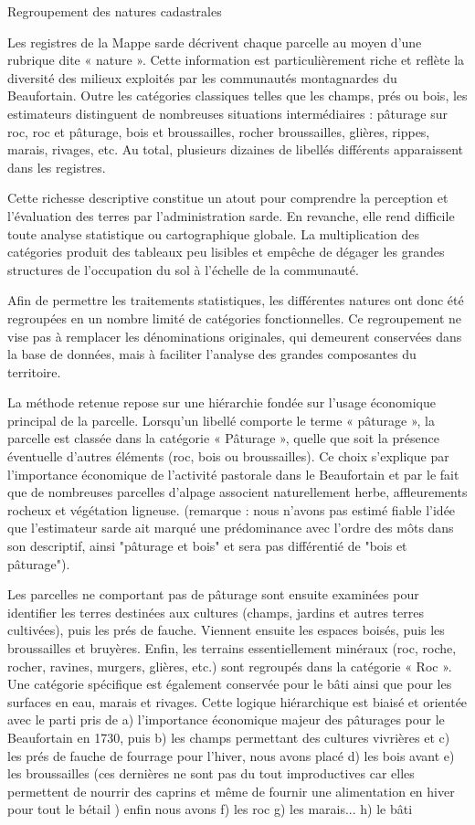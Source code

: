 \documentclass[12pt,a4paper]{report}
\begin{document}
Regroupement des natures cadastrales

Les registres de la Mappe sarde décrivent chaque parcelle au moyen d'une rubrique dite « nature ». Cette information est particulièrement riche et reflète la diversité des milieux exploités par les communautés montagnardes du Beaufortain. Outre les catégories classiques telles que les champs, prés ou bois, les estimateurs distinguent de nombreuses situations intermédiaires : pâturage sur roc, roc et pâturage, bois et broussailles, rocher broussailles, glières, rippes, marais, rivages, etc. Au total, plusieurs dizaines de libellés différents apparaissent dans les registres.

Cette richesse descriptive constitue un atout pour comprendre la perception et l'évaluation des terres par l'administration sarde. En revanche, elle rend difficile toute analyse statistique ou cartographique globale. La multiplication des catégories produit des tableaux peu lisibles et empêche de dégager les grandes structures de l'occupation du sol à l'échelle de la communauté.

Afin de permettre les traitements statistiques, les différentes natures ont donc été regroupées en un nombre limité de catégories fonctionnelles. Ce regroupement ne vise pas à remplacer les dénominations originales, qui demeurent conservées dans la base de données, mais à faciliter l'analyse des grandes composantes du territoire.

La méthode retenue repose sur une hiérarchie fondée sur l'usage économique principal de la parcelle. Lorsqu'un libellé comporte le terme « pâturage », la parcelle est classée dans la catégorie « Pâturage », quelle que soit la présence éventuelle d'autres éléments (roc, bois ou broussailles). Ce choix s'explique par l'importance économique de l'activité pastorale dans le Beaufortain et par le fait que de nombreuses parcelles d'alpage associent naturellement herbe, affleurements rocheux et végétation ligneuse. (remarque : nous n'avons pas estimé fiable l'idée que l'estimateur sarde ait marqué une prédominance avec l'ordre des môts dans son descriptif, ainsi "pâturage et bois" et sera pas différentié de "bois et pâturage").

Les parcelles ne comportant pas de pâturage sont ensuite examinées pour identifier les terres destinées aux cultures (champs, jardins et autres terres cultivées), puis les prés de fauche. Viennent ensuite les espaces boisés, puis les broussailles et bruyères. Enfin, les terrains essentiellement minéraux (roc, roche, rocher, ravines, murgers, glières, etc.) sont regroupés dans la catégorie « Roc ». Une catégorie spécifique est également conservée pour le bâti ainsi que pour les surfaces en eau, marais et rivages. Cette logique hiérarchique est biaisé et orientée avec le parti pris de a) l'importance économique majeur des pâturages pour le Beaufortain en 1730, puis b) les champs permettant des cultures vivrières et c) les prés de fauche de fourrage pour l'hiver, nous avons placé d) les bois avant e) les broussailles (ces dernières ne sont pas du tout improductives car elles permettent de nourrir des caprins et même de fournir une alimentation en hiver pour tout le bétail ) enfin nous avons f) les roc g) les marais... h) le bâti
\end{document}
